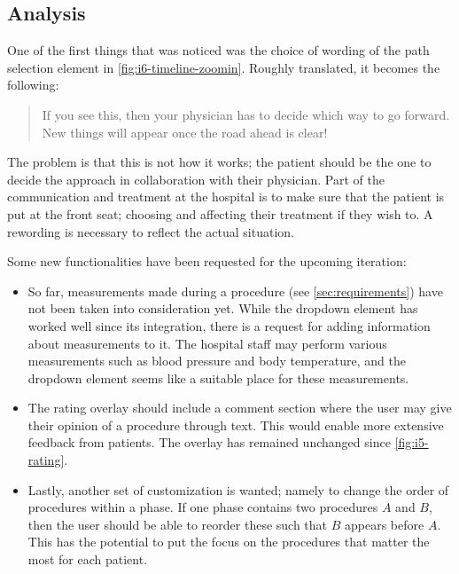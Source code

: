 \subsection{Analysis}

One of the first things that was noticed was the choice of wording of the path selection element in \autoref{fig:i6-timeline-zoomin}. Roughly translated, it becomes the following:

\begin{quote}
    If you see this, then your physician has to decide which way to go forward. New things will appear once the road ahead is clear!
\end{quote}

The problem is that this is not how it works; the patient should be the one to decide the approach in collaboration with their physician. Part of the communication and treatment at the hospital is to make sure that the patient is put at the front seat; choosing and affecting their treatment if they wish to. A rewording is necessary to reflect the actual situation.

Some new functionalities have been requested for the upcoming iteration:

\begin{itemize}
    \item So far, measurements made during a procedure (see \autoref{sec:requirements}) have not been taken into consideration yet. While the dropdown element has worked well since its integration, there is a request for adding information about measurements to it. The hospital staff may perform various measurements such as blood pressure and body temperature, and the dropdown element seems like a suitable place for these measurements.

    \item The rating overlay should include a comment section where the user may give their opinion of a procedure through text. This would enable more extensive feedback from patients. The overlay has remained unchanged since \autoref{fig:i5-rating}.
    
    \item Lastly, another set of customization is wanted; namely to change the order of procedures within a phase. If one phase contains two procedures $A$ and $B$, then the user should be able to reorder these such that $B$ appears before $A$. This has the potential to put the focus on the procedures that matter the most for each patient.
\end{itemize}

